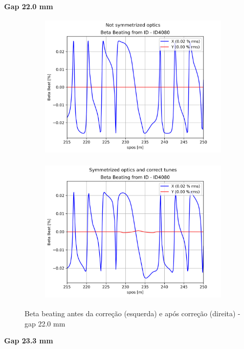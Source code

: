 \documentclass[a4paper,12pt]{article}
\begin{document}
\textbf{Gap 22.0 mm} \\

\begin{figure}[H]
\begin{subfigure}{0.5\textwidth}
\includegraphics[width=0.9\linewidth, height=7cm]{figs/phase16 gap22 uncorrected-optics.png} 
\label{fig:subim11622}
\end{subfigure}
\begin{subfigure}{0.5\textwidth}
\includegraphics[width=0.9\linewidth, height=7cm]{figs/phase16 gap22 corrected-optics-tunes.png}
\label{fig:subim21622}
\end{subfigure}
\caption{Beta beating antes da correção (esquerda) e após correção (direita) - gap 22.0 mm}
\label{fig:bb16_22}
\end{figure}

\textbf{Gap 23.3 mm} \\
\end{document}

